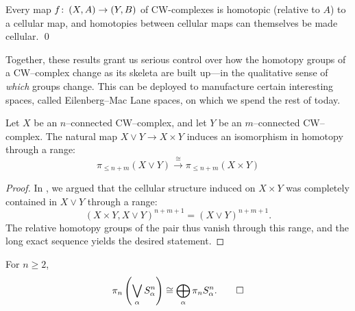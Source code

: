 \begin{corollary}
Every map $f\colon\thinspace (X, A) \to (Y, B)$ of CW-complexes is homotopic (relative to $A$) to a cellular map, and homotopies between cellular maps can themselves be made cellular. \qed
\end{corollary}

Together, these results grant us serious control over how the homotopy groups of a CW--complex change as its skeleta are built up---in the qualitative sense of \emph{which} groups change.
This can be deployed to manufacture certain interesting spaces, called Eilenberg--Mac Lane spaces, on which we spend the rest of today.

\begin{corollary}
Let $X$ be an $n$--connected CW--complex, and let $Y$ be an $m$--connected CW--complex.
The natural map $X \vee Y \to X \times Y$ induces an isomorphism in homotopy through a range: \[\pi_{\le n+m}(X \vee Y) \xrightarrow\cong \pi_{\le n+m}(X \times Y)\]
\end{corollary}
\begin{proof}
In , we argued that the cellular structure induced on $X \times Y$ was completely contained in $X \vee Y$ through a range: \[(X \times Y, X \vee Y)^{n+m+1} = (X \vee Y)^{n+m+1}.\]
The relative homotopy groups of the pair thus vanish through this range, and the long exact sequence yields the desired statement.
\end{proof}

\begin{corollary}\label{PinOfSphereBouquet}%
For $n \ge 2$,
\[\pi_n\left(\bigvee_\alpha S^n_\alpha\right) \cong \bigoplus_\alpha \pi_n S^n_\alpha.
\qed\]
\end{corollary}

